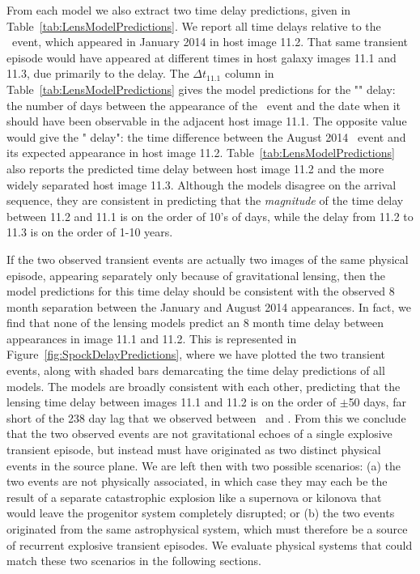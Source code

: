 From each model we also extract two time delay predictions, given in Table~\ref{tab:LensModelPredictions}.  We report all time delays relative to the \spockone\ event, which appeared in January 2014 in host image 11.2.  That same transient episode would have appeared at different times in host galaxy images 11.1 and 11.3, due primarily to the \citet{Shapiro:1964} delay. 
The $\Delta t_{11.1}$ column in Table~\ref{tab:LensModelPredictions} gives the model predictions for 
the "" delay: the number of days between the appearance of the \spockone\ event and the date when it should have been observable in the adjacent host image 11.1.  The opposite value would give the " delay": the time difference between the August 2014 \spocktwo\ event and its expected appearance in host image 11.2.  Table~\ref{tab:LensModelPredictions} also reports the predicted time delay between host image 11.2 and the more widely separated host image 11.3.  Although the models disagree on the arrival sequence, they are consistent in predicting that the {\it magnitude} of the time delay between 11.2 and 11.1 is on the order of 10's of days, while the delay from 11.2 to 11.3 is on the order of 1-10 years.  

If the two observed transient events are actually two images of the same physical episode, appearing separately only because of gravitational lensing, then the model predictions for this time delay should be consistent with the observed 8 month separation between the January and August 2014 appearances.  In fact, we find that none of the lensing models predict an 8 month time delay between appearances in image 11.1 and 11.2.  This is represented in Figure~\ref{fig:SpockDelayPredictions}, where we have plotted the two transient events, along with shaded bars demarcating the time delay predictions of all models.   The models are broadly consistent with each other, predicting that the lensing time delay between images 11.1 and 11.2 is on the order of $\pm$50 days, far short of the 238 day lag that we observed between \spockone\ and \spocktwo.  From this we conclude that the two observed events are not gravitational echoes of a single explosive transient episode, but instead must have originated as two distinct physical events in the source plane.  We are left then with two possible scenarios: (a) the two events are not physically associated, in which case they may each be the result of a separate catastrophic explosion like a supernova or kilonova that would leave the progenitor system completely disrupted; or (b) the two events originated from the same astrophysical system, which must therefore be a source of recurrent explosive transient episodes.   We evaluate physical systems that could match these two scenarios in the following sections.

